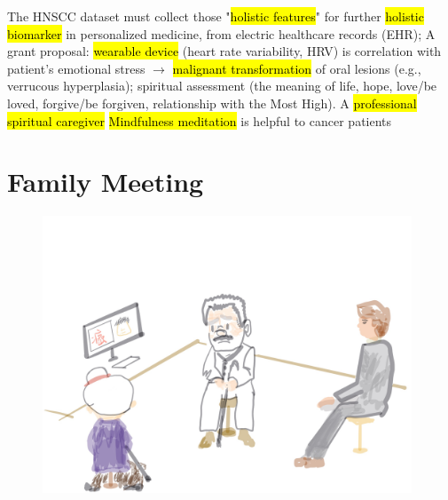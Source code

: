 \documentclass[
paper=landscape,
paper=160mm:90mm, %
fontsize=11pt, %
pagesize, %
parskip=half-, %
]{scrartcl} %
\theoremstyle{mythmstyle} %
\begin{document}
{\begin{outline}
\1 The HNSCC dataset must collect those "\hl{holistic features}" for further \hl{holistic biomarker} in personalized medicine, from
    \2 electric healthcare records (EHR);
    \2 A grant proposal: \hl{wearable device} (heart rate variability, HRV) is correlation with patient's emotional stress $\longrightarrow$ \hl{malignant transformation} of oral lesions (e.g., verrucous hyperplasia);
    \2 spiritual assessment (the meaning of life, hope, love/be loved, forgive/be forgiven, relationship with the Most High).
\1 A \hl{professional spiritual caregiver} 
    \2 \hl{Mindfulness meditation} is helpful to cancer patients
\end{outline}


} %

\clearpage
\section{Family Meeting}
\begin{figure}
    \centering
\includegraphics[width=11cm]{family_meeting_Cheung202109.jpg}
\end{figure}
\end{document}
